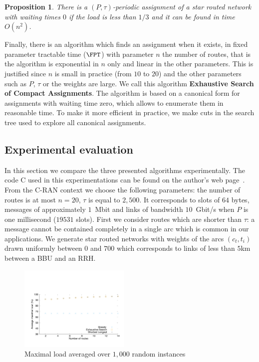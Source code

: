 \documentclass[a4paper,10pt]{IEEEtran}
\newtheorem{proposition}{Proposition}
\begin{document}
      \begin{proposition}
    There is a $(P,\tau)$-periodic assignment of a star routed network with waiting times $0$ if the load is less than $1/3$ and it can be found in time $O(n^2)$.
    \end{proposition}
    
Finally, there is an algorithm which finds an assignment when it exists, in fixed parameter tractable time ($\FPT$) with parameter $n$ the number of routes, that is the algorithm is exponential in $n$ only and linear in the other parameters. This is justified since $n$ is small in practice (from $10$ to $20$) and the other parameters such as $P$, $\tau$ or the weights are large. We call this algorithm \textbf{Exhaustive Search of Compact Assignments}. The algorithm is based on a canonical form for assignments with waiting time zero, which allows to enumerate them in reasonable time. To make it more efficient in practice, we make cuts in the search tree used to explore all canonical assignments. 

   \subsection{Experimental evaluation}\label{sec:exp_PAZL}
   
   In this section we compare the three presented algorithms experimentally. The code C used in this experimentations can be found on the author's web page~\cite{yannsite}.  From the C-RAN context we choose the following parameters: the number of routes is at most $n = 20$, $\tau$ is equal to $2,500$. It corresponds to slots of $64$ bytes, messages of approximately $1$~Mbit and links of bandwidth $10$~Gbit/s when $P$ is one millisecond ($19531$ slots). 
      First we consider routes which are shorter than $\tau$: a message cannot be contained completely in a single arc which is common in our applications. We generate star routed networks with weights of the arcs $(c_t,t_i)$ drawn uniformly between $0$ and $700$ which corresponds to links of less than $5$km between a BBU and an RRH. 

        
      \begin{figure}[h]
      \begin{center}
	 \includegraphics[width=0.47\textwidth]{periode_petite.pdf}
      \end{center}
      \caption{Maximal load averaged over $1,000$ random instances}\label{fig:short}
      \end{figure}
      
\end{document}
